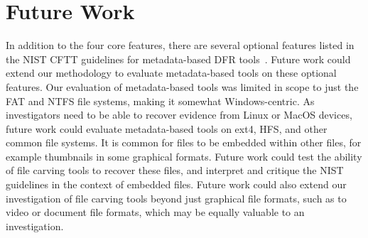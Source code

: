 \section{Future Work}

In addition to the four core features, there are several optional features listed in the NIST CFTT guidelines for metadata-based DFR tools~\cite{meta:dfr:standards}.
Future work could extend our methodology to evaluate metadata-based tools on these optional features.
Our evaluation of metadata-based tools was limited in scope to just the FAT and NTFS file systems, making it somewhat Windows-centric.
As investigators need to be able to recover evidence from Linux or MacOS devices, future work could evaluate metadata-based tools on ext4, HFS, and other common file systems.
It is common for files to be embedded within other files, for example thumbnails in some graphical formats.
Future work could test the ability of file carving tools to recover these files, and interpret and critique the NIST guidelines in the context of embedded files.
Future work could also extend our investigation of file carving tools beyond just graphical file formats, such as to video or document file formats, which may be equally valuable to an investigation.

